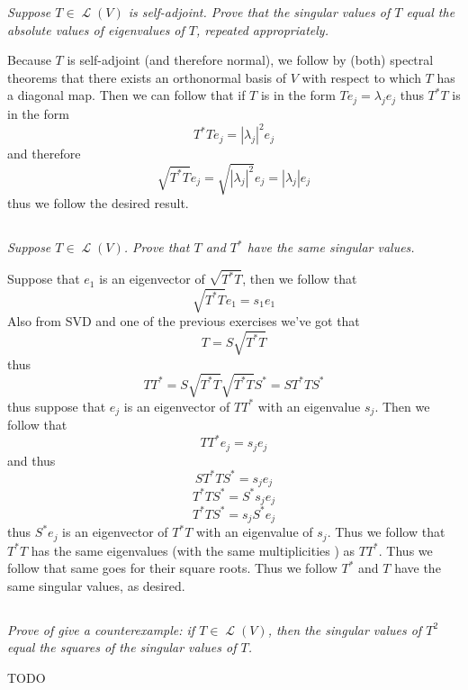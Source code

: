 \documentclass[11pt,oneside,titlepage]{book}
\DeclareMathOperator \map {\mathcal {L}}
\begin{document}
\textit{Suppose $T \in \map(V)$ is self-adjoint. Prove that the singular values of $T$
  equal the absolute values of eigenvalues of $T$, repeated appropriately.}

Because $T$ is self-adjoint (and therefore normal), we follow by (both) spectral theorems that
there exists an orthonormal basis of $V$ with respect to which $T$ has a diagonal map.
Then we can follow that if $T$ is in the form
$T e_j = \lambda_j e_j$
thus $T^*T$ is in the form
$$T^*T e_j = |\lambda_j|^2e_j$$
and therefore
$$\sqrt{T^*T} e_j = \sqrt{|\lambda_j|^2}e_j = |\lambda_j| e_j$$
thus we follow the desired result.

\subsection{}

\textit{Suppose $T \in \map(V)$. Prove that $T$ and $T^*$ have the same singular values.}

Suppose that $e_1$ is an eigenvector of  $\sqrt{T^* T}$, then we follow that
$$ \sqrt{T^* T} e_1 = s_1 e_1$$
Also from SVD and one of the previous exercises we've got that
$$T = S \sqrt{T^* T}$$
thus
$$T T^* = S \sqrt{T^* T} \sqrt{T^* T} S^* = S T^* T S^*$$
thus suppose that $e_j$ is an eigenvector of $T T^*$ with an eigenvalue $s_j$. Then we follow that
$$T T^* e_j = s_j e_j$$
and thus
$$S T^* T S^* = s_j e_j$$
$$T^* T S^* = S^*s_j e_j$$
$$T^* T S^* = s_j S^* e_j$$
thus $S^* e_j$ is an eigenvector of $T^* T$ with an eigenvalue of $s_j$. Thus we follow that
$T^* T$ has the same eigenvalues (with the same multiplicities ) as $TT^*$. Thus we follow that
same goes for their square roots. Thus we follow $T^*$ and $T$ have the same singular values, as
desired.

\subsection{}

\textit{Prove of give a counterexample: if $T \in \map(V)$, then the singular values of $T^2$
  equal the squares of the singular values of $T$.}

TODO
\end{document}
